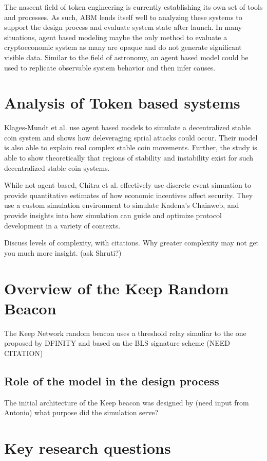 \documentclass[conference]{IEEEtran}
\begin{document}
The nascent field of token engineering is currently establishing its own set 
of tools and processes. As such, ABM lends itself well to analyzing these systems
to support the design process and evaluate system state after launch. In many situations,
agent based modeling maybe the only method to evaluate a cryptoeconomic system as many are
opaque and do not generate significant visible data. Similar to the field of astronomy, an
agent based model could be used to replicate observable system behavior and then infer
causes. 

\section{Analysis of Token based systems}
Klages-Mundt et al.\cite{klages2019stability} use agent based models to simulate a decentralized stable coin
system and shows how deleveraging sprial attacks could occur. Their model is also able
to explain real complex stable coin movements. Further, the study is able
to show theoretically that regions of stability and instability exist for such decentralized
stable coin systems. 

While not agent based, Chitra et al. \cite{chitra2019agent} effectively use discrete event simuation to provide
quantitative estimates of how economic incentives affect security. They use a custom simulation
environment to simulate Kadena's Chainweb, and provide insights into how simulation can guide
and optimize protocol development in a variety of contexts.

Discuss levels of complexity, with citations. Why greater complexity may
not get you much more insight. (ask Shruti?)

\section{Overview of the Keep Random Beacon}
The Keep Network random beacon uses a threshold relay simuliar to the one proposed
by DFINITY and based on the BLS signature scheme \cite{} (NEED CITATION)

\subsection{Role of the model in the design process}
The initial architecture of the Keep beacon was designed by (need input from Antonio)
what purpose did the simulation serve?

\section{Key research questions}
\end{document}
